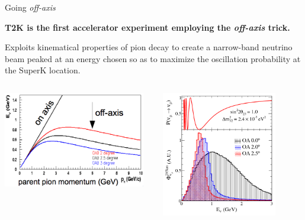 \begin{frame}{Going {\em off-axis}}

{\bf T2K is the first accelerator experiment employing the {\em off-axis} trick.}

Exploits kinematical properties of pion decay to create a narrow-band neutrino beam
peaked at an energy chosen so as to maximize the oscillation probability at the SuperK location.

\begin{columns}
  \begin{column}{0.55\textwidth}
     \includegraphics[width=0.95\textwidth]{./images/3nu/accelerator/offaxis_angle_epi_vs_enu_degrees.png}
  \end{column}
  \begin{column}{0.45\textwidth}
     \includegraphics[width=0.80\textwidth]{./images/3nu/accelerator/oaeffect_flux.png}
  \end{column}
\end{columns}
\end{frame}


